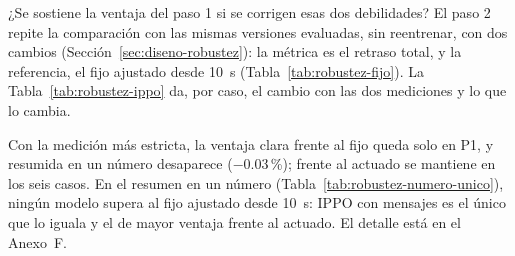 ¿Se sostiene la ventaja del paso 1 si se corrigen esas dos debilidades?
El paso 2 repite la comparación con las mismas versiones evaluadas, sin
reentrenar, con dos cambios (Sección~\ref{sec:diseno-robustez}): la
métrica es el retraso total, y la referencia, el fijo ajustado desde
10~s (Tabla~\ref{tab:robustez-fijo}). La
Tabla~\ref{tab:robustez-ippo} da, por caso, el cambio con las dos
mediciones y lo que lo cambia.

Con la medición más estricta, la ventaja clara frente al fijo queda
solo en P1, y resumida en un número desaparece ($-0.03$\,\%); frente al
actuado se mantiene en los seis casos. En el resumen en un número
(Tabla~\ref{tab:robustez-numero-unico}), ningún modelo supera al fijo
ajustado desde 10~s: IPPO con mensajes es el único que lo iguala y el de
mayor ventaja frente al actuado. El detalle está en el Anexo~F.
